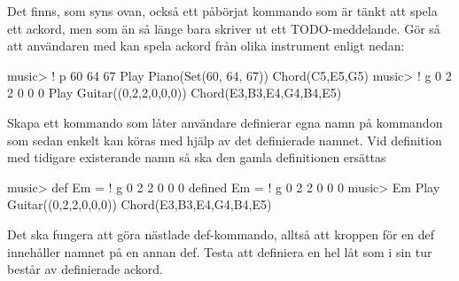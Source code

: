 Det finns, som syns ovan, också ett påbörjat kommando \code{!} som är tänkt att spela ett ackord, men som än så länge bara skriver ut ett TODO-meddelande. Gör så att användaren med \code{!} kan spela ackord från olika instrument enligt nedan:

\begin{REPL}
music> ! p 60 64 67
Play Piano(Set(60, 64, 67)) Chord(C5,E5,G5)
music> ! g 0 2 2 0 0 0
Play Guitar((0,2,2,0,0,0)) Chord(E3,B3,E4,G4,B4,E5)
\end{REPL}




\Task Skapa ett kommando som låter användare definierar egna namn på kommandon som sedan enkelt kan köras med hjälp av det definierade namnet. Vid definition med tidigare existerande namn så ska den gamla definitionen ersättas
\begin{REPL}
music> def Em = ! g 0 2 2 0 0 0
defined Em = ! g 0 2 2 0 0 0
music> Em
Play Guitar((0,2,2,0,0,0)) Chord(E3,B3,E4,G4,B4,E5)
\end{REPL}
Det ska fungera att göra nästlade def-kommando, alltså att kroppen för en def innehåller namnet på en annan def. Testa att definiera en hel låt som i sin tur består av definierade ackord.

